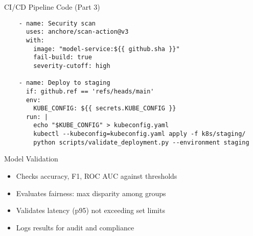 \documentclass[aspectratio=169]{beamer}
\begin{document}

\begin{frame}[fragile]{CI/CD Pipeline Code (Part 3)}
\begin{verbatim}
    - name: Security scan
      uses: anchore/scan-action@v3
      with:
        image: "model-service:${{ github.sha }}"
        fail-build: true
        severity-cutoff: high

    - name: Deploy to staging
      if: github.ref == 'refs/heads/main'
      env:
        KUBE_CONFIG: ${{ secrets.KUBE_CONFIG }}
      run: |
        echo "$KUBE_CONFIG" > kubeconfig.yaml
        kubectl --kubeconfig=kubeconfig.yaml apply -f k8s/staging/
        python scripts/validate_deployment.py --environment staging
\end{verbatim}
\end{frame}


\begin{frame}{Model Validation}


\begin{itemize}
\item Checks accuracy, F1, ROC AUC against thresholds
\item Evaluates fairness: max disparity among groups
\item Validates latency (p95) not exceeding set limits
\item Logs results for audit and compliance
\end{itemize}
\end{frame}
\end{document}
